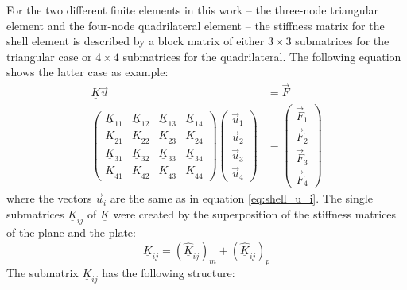  For the two different finite elements in this work -- the three-node triangular element and the four-node quadrilateral element -- the stiffness matrix for the shell element is described by a block matrix of either $3\!\times\!3$ submatrices for the triangular case or $4\!\times\!4$ submatrices for the quadrilateral. The following equation shows the latter case as example:
 \begin{align}\label{eq:shell_K_ij}
 \underline{K} \vec{u} &= \vec{F} \nonumber\\
 \begin{pmatrix}
 \underline{K}_{11} & \underline{K}_{12} & \underline{K}_{13} & \underline{K}_{14}\\
 \underline{K}_{21} & \underline{K}_{22} & \underline{K}_{23} & \underline{K}_{24}\\
 \underline{K}_{31} & \underline{K}_{32} & \underline{K}_{33} & \underline{K}_{34}\\
 \underline{K}_{41} & \underline{K}_{42} & \underline{K}_{43} & \underline{K}_{44}
 \end{pmatrix} \begin{pmatrix}
 \vec{u}_1 \\\vec{u}_2 \\\vec{u}_3\\\vec{u}_4
 \end{pmatrix} &= \begin{pmatrix}
 \vec{F}_1\\\vec{F}_2\\\vec{F}_3\\\vec{F}_4
 \end{pmatrix}
 \end{align}
 where the vectors $\vec{u}_i$ are the same as in equation \eqref{eq:shell_u_i}. The single submatrices $\underline{K}_{ij}$ of $\underline{K}$ were created by the superposition of the stiffness matrices of the plane and the plate:
 \begin{equation}
 \underline{K}_{ij} = \left(\underline{\hat{K}}_{ij}\right)_m + \left(\underline{\hat{K}}_{ij}\right)_p
 \end{equation}
 The submatrix $\underline{K}_{ij}$ has the following structure:
